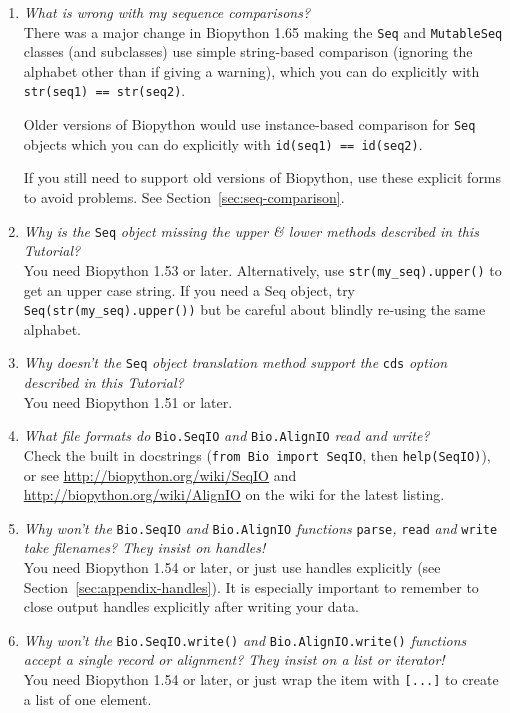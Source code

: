 \begin{enumerate}
  \item \emph{What is wrong with my sequence comparisons?} \\
  There was a major change in Biopython 1.65 making the \verb|Seq| and
  \verb|MutableSeq| classes (and subclasses) use simple string-based
  comparison (ignoring the alphabet other than if giving a warning),
  which you can do explicitly with \verb|str(seq1) == str(seq2)|.

  Older versions of Biopython would use instance-based comparison
  for \verb|Seq| objects which you can do explicitly with
  \verb|id(seq1) == id(seq2)|.

  If you still need to support old versions of Biopython, use these
  explicit forms to avoid problems. See Section~\ref{sec:seq-comparison}.

  \item \emph{Why is the} \verb|Seq| \emph{object missing the upper \& lower methods described in this Tutorial?} \\
  You need Biopython 1.53 or later.  Alternatively, use \verb|str(my_seq).upper()| to get an upper case string.
  If you need a Seq object, try \verb|Seq(str(my_seq).upper())| but be careful about blindly re-using the same alphabet.

  \item \emph{Why doesn't the} \verb|Seq| \emph{object translation method support the} \verb|cds| \emph{option described in this Tutorial?} \\
  You need Biopython 1.51 or later.

  \item \emph{What file formats do} \verb|Bio.SeqIO| \emph{and} \verb|Bio.AlignIO| \emph{read and write?} \\
  Check the built in docstrings (\texttt{from Bio import SeqIO}, then \texttt{help(SeqIO)}), or see \url{http://biopython.org/wiki/SeqIO} and \url{http://biopython.org/wiki/AlignIO} on the wiki for the latest listing.

  \item \emph{Why won't the } \verb|Bio.SeqIO| \emph{and} \verb|Bio.AlignIO| \emph{functions} \verb|parse|\emph{,} \verb|read| \emph{and} \verb|write| \emph{take filenames? They insist on handles!} \\
  You need Biopython 1.54 or later, or just use handles explicitly (see Section~\ref{sec:appendix-handles}).
  It is especially important to remember to close output handles explicitly after writing your data.

  \item \emph{Why won't the } \verb|Bio.SeqIO.write()| \emph{and} \verb|Bio.AlignIO.write()| \emph{functions accept a single record or alignment? They insist on a list or iterator!} \\
  You need Biopython 1.54 or later, or just wrap the item with \verb|[...]| to create a list of one element.


\end{enumerate}
